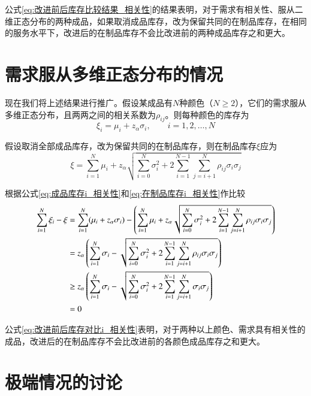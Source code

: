 公式\ref{eq:改进前后库存比较结果_相关性}的结果表明，对于需求有相关性、服从二维正态分布的两种成品，如果取消成品库存，改为保留共同的在制品库存，在相同的服务水平下，改进后的在制品库存不会比改进前的两种成品库存之和更大。







\section{需求服从多维正态分布的情况}

现在我们将上述结果进行推广。假设某成品有$N$种颜色（$N\geq 2$），它们的需求服从多维正态分布，且两两之间的相关系数为$\rho_{ij}$。则每种颜色的库存为
\begin{equation}
\xi_i = \mu_i + z_\alpha\sigma_i,\qquad i=1,2,\ldots,N
\label{eq:成品库存i_相关性}
\end{equation}

假设取消全部成品库存，改为保留共同的在制品库存，则在制品库存$\xi$应为
\begin{equation}
\xi = \sum_{i=1}^N\mu_i + z_\alpha\sqrt{\sum_{i=0}^N\sigma_i^2 + 2\sum_{i=1}^{N-1}\sum_{j=i+1}^N\rho_{ij}\sigma_i\sigma_j}
\label{eq:在制品库存i_相关性}
\end{equation}

根据公式\ref{eq:成品库存i_相关性}和\ref{eq:在制品库存i_相关性}作比较
\begin{align}
\sum_{i=1}^N\xi_i - \xi &= \sum_{i=1}^N(\mu_i+z_\alpha\sigma_i) - \left(\sum_{i=1}^N\mu_i + z_\alpha\sqrt{\sum_{i=0}^N\sigma_i^2 + 2\sum_{i=1}^{N-1}\sum_{j=i+1}^N\rho_{ij}\sigma_i\sigma_j}\right) \notag\\
&= z_\alpha\left(\sum_{i=1}^N\sigma_i-\sqrt{\sum_{i=0}^N\sigma_i^2 + 2\sum_{i=1}^{N-1}\sum_{j=i+1}^N\rho_{ij}\sigma_i\sigma_j}\right) \notag\\
&\geq z_\alpha\left(\sum_{i=1}^N\sigma_i-\sqrt{\sum_{i=0}^N\sigma_i^2 + 2\sum_{i=1}^{N-1}\sum_{j=i+1}^N\sigma_i\sigma_j}\right) \notag\\
& = 0
\label{eq:改进前后库存对比i_相关性}
\end{align}

公式\ref{eq:改进前后库存对比i_相关性}表明，对于两种以上颜色、需求具有相关性的成品，改进后的在制品库存不会比改进前的各颜色成品库存之和更大。






\section{极端情况的讨论}

